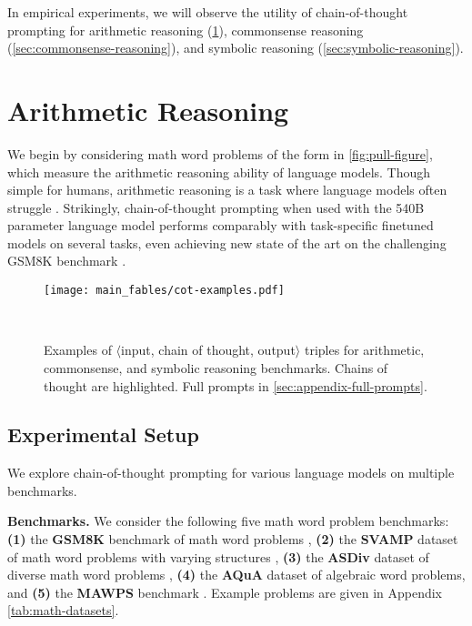 \documentclass[]{article}
\theoremstyle{plain}
\theoremstyle{definition}
\theoremstyle{remark}
\begin{document}
In empirical experiments, we will observe the utility of chain-of-thought prompting for arithmetic reasoning (\cref{sec:arithmetic-reasoning}), commonsense reasoning (\cref{sec:commonsense-reasoning}), and symbolic reasoning (\cref{sec:symbolic-reasoning}).


\section{Arithmetic Reasoning}\label{sec:arithmetic-reasoning}
We begin by considering math word problems of the form in \cref{fig:pull-figure}, which measure the arithmetic reasoning ability of language models.
Though simple for humans, arithmetic reasoning is a task where language models often struggle \citep[][\textit{inter alia}]{hendrycks2021measuring,patel-etal-2021-nlp}.
Strikingly, chain-of-thought prompting when used with the 540B parameter language model performs comparably with task-specific finetuned models on several tasks, even achieving new state of the art on the challenging GSM8K benchmark \citep{cobbe2021training}.



\begin{figure}[t]
\centering
\texttt{[image: main\_fables/cot-examples.pdf]}
\caption{
Examples of $\langle$input, chain of thought, output$\rangle$ triples for arithmetic, commonsense, and symbolic reasoning benchmarks. Chains of thought are highlighted.
Full prompts in \cref{sec:appendix-full-prompts}.
}
\vspace{-5mm}~
\label{fig:dataset-examples}
\end{figure}

\subsection{Experimental Setup}

We explore chain-of-thought prompting for various language models on multiple benchmarks.

\textbf{Benchmarks.}
We consider the following five math word problem benchmarks:
\textbf{(1)} the \textbf{GSM8K} benchmark of math word problems \citep{cobbe2021training}, 
\textbf{(2)} the \textbf{SVAMP} dataset of math word problems with varying structures \citep{patel-etal-2021-nlp},
\textbf{(3)} the \textbf{ASDiv} dataset of diverse math word problems \citep{miao-etal-2020-diverse},
\textbf{(4)} the \textbf{AQuA} dataset of algebraic word problems, and
\textbf{(5)} the \textbf{MAWPS} benchmark \citep{koncel-kedziorski-etal-2016-mawps}.
Example problems are given in Appendix \cref{tab:math-datasets}.
\end{document}
